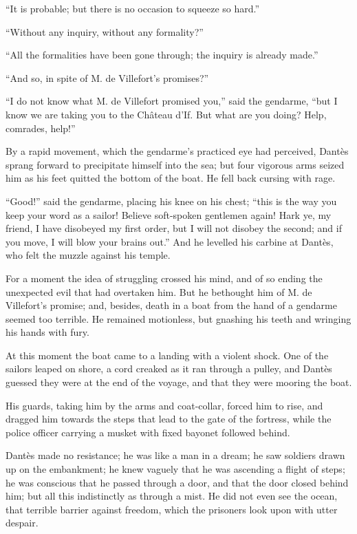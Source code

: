 “It is probable; but there is no occasion to squeeze so hard.”

“Without any inquiry, without any formality?”

“All the formalities have been gone through; the inquiry is already
made.”

“And so, in spite of M. de Villefort’s promises?”

“I do not know what M. de Villefort promised you,” said the gendarme,
“but I know we are taking you to the Château d’If. But what are you
doing? Help, comrades, help!”

By a rapid movement, which the gendarme’s practiced eye had perceived,
Dantès sprang forward to precipitate himself into the sea; but four
vigorous arms seized him as his feet quitted the bottom of the boat. He
fell back cursing with rage.

“Good!” said the gendarme, placing his knee on his chest; “this is the
way you keep your word as a sailor! Believe soft-spoken gentlemen
again! Hark ye, my friend, I have disobeyed my first order, but I will
not disobey the second; and if you move, I will blow your brains out.”
And he levelled his carbine at Dantès, who felt the muzzle against his
temple.

For a moment the idea of struggling crossed his mind, and of so ending
the unexpected evil that had overtaken him. But he bethought him of M.
de Villefort’s promise; and, besides, death in a boat from the hand of
a gendarme seemed too terrible. He remained motionless, but gnashing
his teeth and wringing his hands with fury.

At this moment the boat came to a landing with a violent shock. One of
the sailors leaped on shore, a cord creaked as it ran through a pulley,
and Dantès guessed they were at the end of the voyage, and that they
were mooring the boat.

His guards, taking him by the arms and coat-collar, forced him to rise,
and dragged him towards the steps that lead to the gate of the
fortress, while the police officer carrying a musket with fixed bayonet
followed behind.

Dantès made no resistance; he was like a man in a dream; he saw
soldiers drawn up on the embankment; he knew vaguely that he was
ascending a flight of steps; he was conscious that he passed through a
door, and that the door closed behind him; but all this indistinctly as
through a mist. He did not even see the ocean, that terrible barrier
against freedom, which the prisoners look upon with utter despair.


